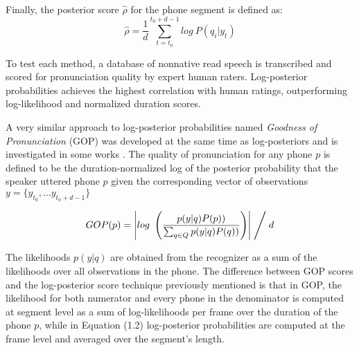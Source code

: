 Finally, the posterior score $\hat{\rho}$ for the phone segment is defined as:
\begin{equation}
\hat{\rho} = \frac{1}{d}\sum_{t=t_{0}}^{t_{0}+d-1} log \ P(q_{i}|y_{t})
\end{equation}

To test each method, a database of nonnative read speech is transcribed and scored for 
pronunciation quality by expert human raters. Log-posterior probabilities achieves the
highest correlation with human ratings, outperforming log-likelihood and normalized duration
scores.

A very similar approach to log-posterior probabilities named \textit{Goodness of Pronunciation}
(GOP) was developed at the same time as log-posteriors and
is investigated in some works \cite{gop_1, gop_2, gop_3}. The quality of 
pronunciation for any phone $p$ is defined to be the duration-normalized log of the posterior
probability that the speaker uttered phone $p$ given the corresponding vector of observations
$y=\{y_{t_{0}}, \dotsc y_{t_{0}+d-1} \}$

\begin{equation}
GOP(p) = \left| log \ \left(\frac{p(y|q)P(p))}{\sum_{q \in Q}p(y|q)P(q))}\right) \right| \Biggm/ d 
\end{equation}

The likelihoods $p(y|q)$ are obtained from the recognizer as a sum of the likelihoods over all
observations in the phone.
The difference between GOP scores and the log-posterior score technique previously mentioned 
is that in GOP, the likelihood for both numerator and every phone in the denominator is
computed at segment level as a sum of log-likelihoods per frame over the 
duration of the phone $p$, while in Equation (1.2) log-posterior probabilities are computed
at the frame level and averaged over the segment's length.

